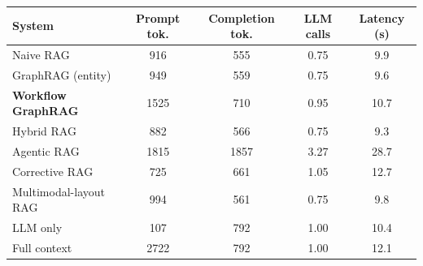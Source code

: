 \begin{tabular}{lcccc}
\toprule
System & Prompt tok. & Completion tok. & LLM calls & Latency (s) \\
\midrule
Naive RAG & 916 & 555 & 0.75 & 9.9 \\
GraphRAG (entity) & 949 & 559 & 0.75 & 9.6 \\
\textbf{Workflow GraphRAG} & 1525 & 710 & 0.95 & 10.7 \\
Hybrid RAG & 882 & 566 & 0.75 & 9.3 \\
Agentic RAG & 1815 & 1857 & 3.27 & 28.7 \\
Corrective RAG & 725 & 661 & 1.05 & 12.7 \\
Multimodal-layout RAG & 994 & 561 & 0.75 & 9.8 \\
LLM only & 107 & 792 & 1.00 & 10.4 \\
Full context & 2722 & 792 & 1.00 & 12.1 \\
\bottomrule
\end{tabular}
